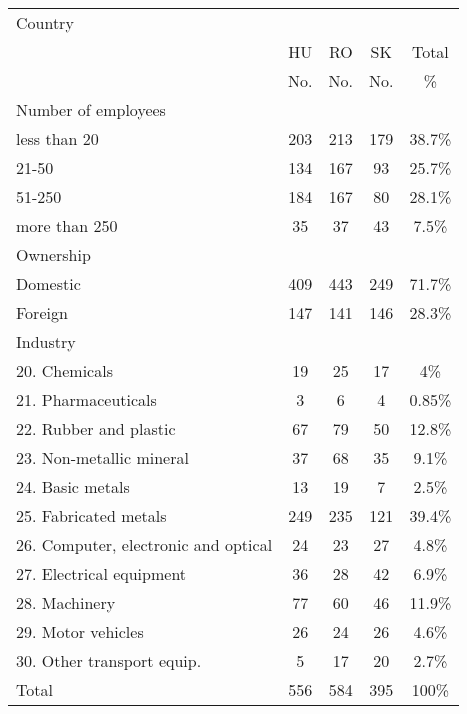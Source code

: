 
\begin{tabular}{lcccc} \hline
	Country		\\
	&HU	&RO & SK & Total \\
	&No. &No. &No. & \% \\
Number of employees	&&&& \\			
less than 20 &	203	&213&	179&	38.7\% \\
21-50&	134&	167&	93	& 25.7\%\\
51-250	&184	&167	&80	& 28.1\% \\
more than 250	&35&	37&	43	& 7.5\% \\
\hline
Ownership &&&& \\				
Domestic	&409	&443	&249	& 71.7\% \\
Foreign	&147	&141	&146	& 28.3\% \\
\hline
Industry &&&&\\				
20. Chemicals & 	19 &	25 &	17	& 4\% \\
21. Pharmaceuticals&	3	&6	&4	& 0.85\% \\
22. Rubber and plastic &	67&	79&	50&	12.8\%\\
23. Non-metallic mineral&	37&	68&	35&	9.1\% \\
24. Basic metals	&13	&19	&7	& 2.5\%\\
25. Fabricated metals &	249	&235	&121&	39.4\%\\
26. Computer, electronic and optical &	24	&23&	27&	4.8\% \\
27. Electrical equipment	&36	&28	&42	& 6.9\% \\
28. Machinery &77	&60&	46&	11.9\%\\
29. Motor vehicles&	26&	24&	26&	4.6\%\\
30. Other transport equip. &	5	&17	&20	& 2.7\% \\
\hline

Total	&556	&584	&395	& 100\% \\
\hline
\end{tabular}
